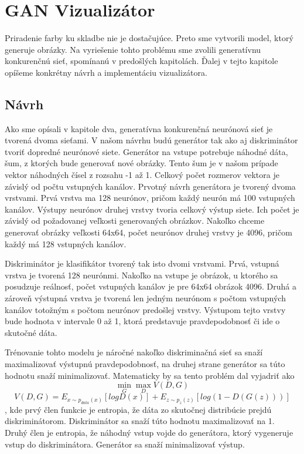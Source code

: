 \chapter{GAN Vizualizátor}
\label{gan}

Priradenie farby ku skladbe nie je dostačujúce.
Preto sme vytvorili model, ktorý generuje obrázky.
Na vyriešenie tohto problému sme zvolili generatívnu konkurenčnú sieť, spomínanú v predošlých kapitolách.
Ďalej v tejto kapitole opíšeme konkrétny návrh a implementáciu vizualizátora.

\section{Návrh}
Ako sme opísali v kapitole dva, generatívna konkurenčná neurónová sieť je tvorená dvoma sieťami.
V našom návrhu budú generátor tak ako aj diskriminátor tvoriť dopredné neurónové siete.
Generátor na vstupe potrebuje náhodné dáta, šum, z ktorých bude generovať nové obrázky.
Tento šum je v našom prípade vektor náhodných čísel z rozsahu -1 až 1.
Celkový počet rozmerov vektora je závislý od počtu vstupných kanálov.
Prvotný návrh generátora je tvorený dvoma vrstvami.
Prvá vrstva ma 128 neurónov, pričom každý neurón má 100 vstupných kanálov.
Výstupy neurónov druhej vrstvy tvoria celkový výstup siete.
Ich počet je závislý od požadovanej veľkosti generovaných obrázkov.
Nakoľko chceme generovať obrázky veľkosti 64x64, počet neurónov druhej vrstvy je 4096, pričom každý má 128 vstupných kanálov.

Diskriminátor je klasifikátor tvorený tak isto dvomi vrstvami.
Prvá, vstupná vrstva je tvorená 128 neurónmi.
Nakoľko na vstupe je obrázok, u ktorého sa posudzuje reálnosť, počet vstupných kanálov je pre 64x64 obrázok 4096.
Druhá a zároveň výstupná vrstva je tvorená len jedným neurónom s počtom vstupných kanálov totožným s počtom neurónov predošlej vrstvy.
Výstupom tejto vrstvy bude hodnota v intervale 0 až 1, ktorá predstavuje pravdepodobnosť či ide o skutočné dáta.

Trénovanie tohto modelu je náročné nakoľko diskriminačná sieť sa snaží maximalizovať výstupnú pravdepodobnosť, na druhej strane generátor sa túto hodnotu snaží minimalizovať.
Matematicky by sa tento problém dal vyjadriť ako \[\min_{G}\max_{D}V(D,G)\]
\[V(D,G)=E_{x\sim p_{data}(x)}[logD(x)] + E_{z\sim p_{z}(z)}[log(1 - D(G(z)))]\]
, kde prvý člen funkcie je entropia, že dáta zo skutočnej distribúcie prejdú diskriminátorom.
Diskriminátor sa snaží túto hodnotu maximalizovať na 1.
Druhý člen je entropia, že náhodný vstup vojde do generátora, ktorý vygeneruje vstup do diskriminátora.
Generátor sa snaží minimalizovať výstup.

